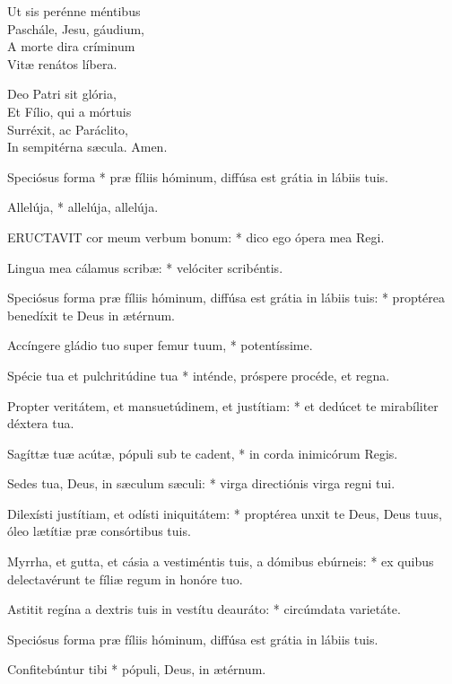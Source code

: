 Ut sis perénne méntibus\\
Paschále, Jesu, gáudium,\\
A morte dira críminum\\
Vitæ renátos líbera.

Deo Patri sit glória,\\
Et Fílio, qui a mórtuis\\
Surréxit, ac Paráclito,\\
In sempitérna sæcula. Amen.



 Speciósus forma * præ fíliis hóminum, diffúsa est grátia in lábiis tuis.


 Allelúja, * allelúja, allelúja.


\lettrine[lines=2]{E}{RUCTAVIT} cor meum verbum bonum: * dico ego ópera mea Regi.

Lingua mea cálamus scribæ: * velóciter scribéntis.

Speciósus forma præ fíliis hóminum, diffúsa est grátia in lábiis tuis: * proptérea benedíxit te Deus in ætérnum.

Accíngere gládio tuo super femur tuum, * potentíssime.

Spécie tua et pulchritúdine tua * inténde, próspere procéde, et regna.

Propter veritátem, et mansuetúdinem, et justítiam: * et dedúcet te mirabíliter déxtera tua.

Sagíttæ tuæ acútæ, pópuli sub te cadent, * in corda inimicórum Regis.

Sedes tua, Deus, in sæculum sæculi: * virga directiónis virga regni tui.

Dilexísti justítiam, et odísti iniquitátem: * proptérea unxit te Deus, Deus tuus, óleo lætítiæ præ consórtibus tuis.

Myrrha, et gutta, et cásia a vestiméntis tuis, a dómibus ebúrneis: * ex quibus delectavérunt te fíliæ regum in honóre tuo.

Astitit regína a dextris tuis in vestítu deauráto: * circúmdata varietáte.

 Speciósus forma præ fíliis hóminum, diffúsa est grátia in lábiis tuis.

 Confitebúntur tibi * pópuli, Deus, in ætérnum.

